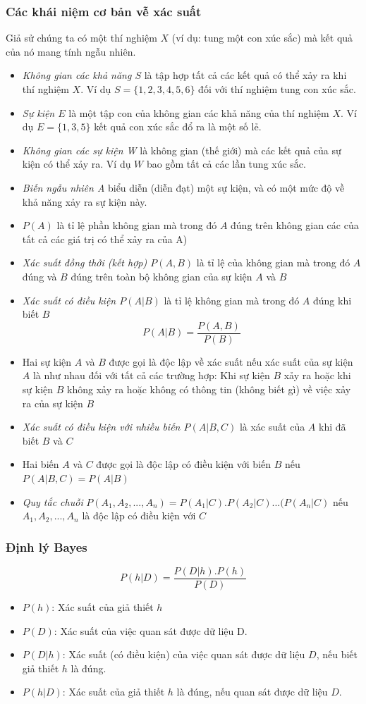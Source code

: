 \documentclass[a4paper,12pt]{report}
\begin{document}
\subsubsection{Các khái niệm cơ bản vễ xác suất}
Giả sử chúng ta có một thí nghiệm $X$ (ví dụ: tung một con xúc sắc) mà kết quả của nó mang tính ngẫu nhiên.
\begin{itemize}
\item \emph{Không gian các khả năng $S$} là tập hợp tất cả các kết quả có thể xảy ra khi thí nghiệm $X$. Ví dụ $S = \{1,2,3,4,5,6\}$ đối với thí nghiệm tung con xúc sắc.
\item \emph{Sự kiện $E$} là một tập con của không gian các khả năng của thí nghiệm $X$. Ví dụ $E=\{1,3,5\}$ kết quả con xúc sắc đổ ra là một số lẻ.
\item \emph{Không gian các sự kiện W} là không gian (thế giới) mà các kết quả của sự kiện có thể xảy ra. Ví dụ $W$ bao gồm tất cả các lần tung xúc sắc.
\item \emph{Biến ngẫu nhiên A} biểu diễn (diễn đạt) một sự kiện, và có một mức độ về khả năng xảy ra sự kiện này.
\item $P(A)$ là tỉ lệ phần không gian mà trong đó $A$ đúng trên không gian các của tất cả các giá trị có thể xảy ra của A) 
\item \emph{Xác suất đồng thởi (kết hợp) $P(A,B)$} là tỉ lệ của không gian mà trong đó $A$ đúng và $B$ đúng trên toàn bộ không gian của sự kiện $A$ và $B$
\item \emph{Xác suất có điều kiện $P(A|B)$} là tỉ lệ không gian mà trong đó $A$ đúng khi biết $B$ 
$$P(A|B) = \frac{P(A,B)}{P(B)}$$
\item Hai sự kiện $A$ và $B$ được gọi là độc lập về xác suất nếu xác suất của sự kiện $A$ là như nhau đối với tất cả các trường hợp: Khi sự kiện $B$ xảy ra hoặc khi sự kiện $B$ không xảy ra hoặc không có thông tin (không biết gì) về việc xảy ra của sự kiện $B$
\item \emph{Xác suất có điều kiện với nhiều biến $P(A|B,C)$} là xác suất của $A$ khi đã biết $B$ và $C$
\item Hai biến $A$ và $C$ được gọi là độc lập có điều kiện với biến $B$ nếu $P(A|B,C) = P(A|B)$
\item \emph{Quy tắc chuỗi} $P(A_1,A_2,...,A_n) = P(A_1|C).P(A_2|C)...(P(A_n|C)$ nếu $A_1,A_2,...,A_n$ là độc lập có điều kiện với $C$    
\end{itemize}

\subsubsection{Định lý Bayes}
$$P(h|D) = \frac{P(D|h).P(h)}{P(D)}$$
\begin{itemize}
\item $P(h)$: Xác suất của giả thiết $h$
\item $P(D)$: Xác suất của việc quan sát được dữ liệu D.
\item $P(D|h)$: Xác suất (có điều kiện) của việc quan sát được dữ liệu $D$, nếu biết giả thiết $h$ là đúng.
\item $P(h|D)$: Xác suất của giả thiết $h$ là đúng, nếu quan sát được dữ liệu $D$.
\end{itemize}
\end{document}
